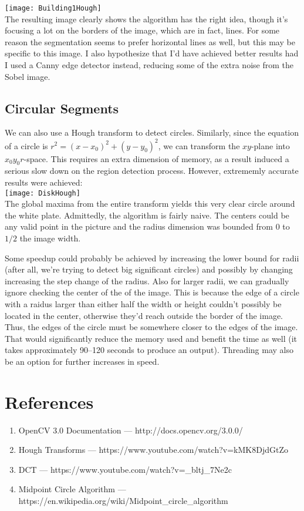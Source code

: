 \documentclass[12pt]{article}
\begin{document}
\texttt{[image: Building1Hough]}\\

The resulting image clearly shows the algorithm has the right idea, though it's
focusing a lot on the borders of the image, which are in fact, lines. For some
reason the segmentation seems to prefer horizontal lines as well, but this may
be specific to this image. I also hypothesize that I'd have achieved better
results had I used a Canny edge detector instead, reducing some of the extra
noise from the Sobel image.

\subsection{Circular Segments}

We can also use a Hough transform to detect circles. Similarly, since the
equation of a circle is $r^2 = {(x - x_0)}^2 + {(y - y_0)}^2$, we can transform the
$xy$-plane into $x_0y_0r$-space. This requires an extra dimension of memory, as
a result induced a serious slow down on the region detection process. However,
extrememly accurate results were achieved:\\

\texttt{[image: DiskHough]}\\

The global maxima from the entire transform yields this very clear circle around
the white plate. Admittedly, the algorithm is fairly naive. The centers could be
any valid point in the picture and the radius dimension was bounded from $0$ to
$1/2$ the image width.

Some speedup could probably be achieved by increasing the
lower bound for radii (after all, we're trying to detect big significant
circles) and possibly by changing increasing the step change of the radius. Also
for larger radii, we can gradually ignore checking the center of the
of the image. This is because the edge of a circle with a raidus larger than either half
the width or height couldn't possibly be located in the center, otherwise they'd reach
outside the border of the image. Thus, the edges of the circle must be somewhere
closer to the edges of the image. That would significantly reduce the memory
used and benefit the time as well (it takes approximately 90--120 seconds to
produce an output). Threading may also be an option for further increases in speed.

\section{References}

\begin{enumerate}
\item OpenCV 3.0 Documentation --- http://docs.opencv.org/3.0.0/
\item Hough Transforms --- https://www.youtube.com/watch?v=kMK8DjdGtZo
\item DCT --- https://www.youtube.com/watch?v={\_}bltj{\_}7Ne2c
\item Midpoint Circle Algorithm --- https://en.wikipedia.org/wiki/Midpoint{\_}circle{\_}algorithm
\end{enumerate}
\end{document}
